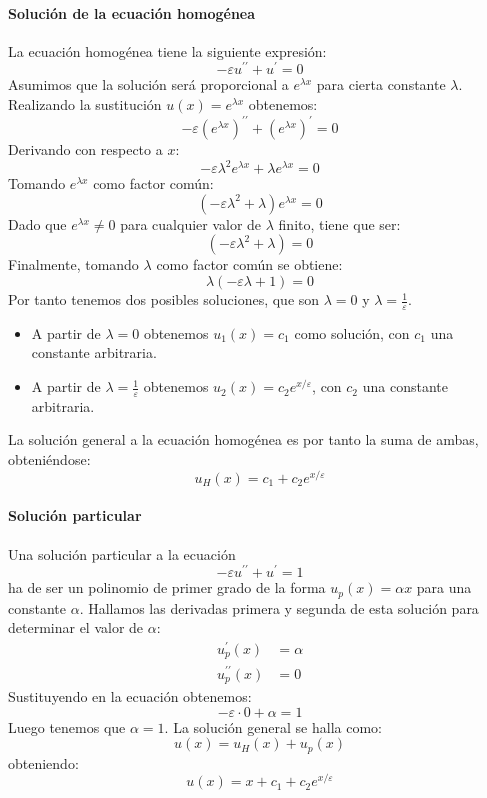 \documentclass[spanish]{mathnotes}
\begin{document}
	\paragraph{Solución de la ecuación homogénea}
	La ecuación homogénea tiene la siguiente expresión:
	$$-\varepsilon u^{\prime\prime}+u^\prime = 0$$
	Asumimos que la solución será proporcional a $e^{\lambda x}$ para cierta constante $\lambda$. Realizando la sustitución $u(x) = e^{\lambda x}$ obtenemos:
	$$-\varepsilon (e^{\lambda x})^{\prime\prime}+(e^{\lambda x})^\prime = 0$$
	Derivando con respecto a $x$:
	$$-\varepsilon\lambda^2e^{\lambda x}+\lambda e^{\lambda x} = 0$$
	Tomando $e^{\lambda x}$ como factor común:
	$$\left(-\varepsilon \lambda^2 +\lambda\right)e^{\lambda x} = 0$$
	Dado que $e^{\lambda x}\neq 0$ para cualquier valor de $\lambda$ finito, tiene que ser:
	$$\left(-\varepsilon \lambda^2 +\lambda\right)=0$$
	Finalmente, tomando $\lambda$ como factor común se obtiene:
	$$\lambda\left(-\varepsilon \lambda + 1\right) = 0$$
	\newpage
	\noindent Por tanto tenemos dos posibles soluciones, que son $\lambda = 0$ y $\lambda = \frac{1}{\varepsilon}$.
	\begin{itemize}
		\item A partir de $\lambda = 0$ obtenemos $u_1(x) =c_1$ como solución, con $c_1$ una constante arbitraria.
		\item A partir de $\lambda = \frac{1}{\varepsilon}$ obtenemos $u_2(x) = c_2 e^{x/\varepsilon}$, con $c_2$ una constante arbitraria.
	\end{itemize}
	La solución general a la ecuación homogénea es por tanto la suma de ambas, obteniéndose:
	$$u_H(x) = c_1+c_2 e^{x/\varepsilon}$$
	\paragraph{Solución particular}
	Una solución particular a la ecuación 
	$$-\varepsilon u^{\prime\prime}+u^\prime = 1$$
	ha de ser un polinomio de primer grado de la forma $u_p(x) = \alpha x$ para una constante $\alpha$.
	Hallamos las derivadas primera y segunda de esta solución para determinar el valor de $\alpha$:
	\begin{align*}
		u_p^\prime(x) &= \alpha\\
		u_p^{\prime\prime}(x) &= 0
	\end{align*}
	Sustituyendo en la ecuación obtenemos:
	$$-\varepsilon\cdot0+\alpha = 1$$
	Luego tenemos que $\alpha=1$. La solución general se halla como: $$u(x) = u_H(x)+u_p(x)$$ obteniendo:
	$$u(x) = x+c_1+c_2e^{x/\varepsilon}$$
\end{document}
